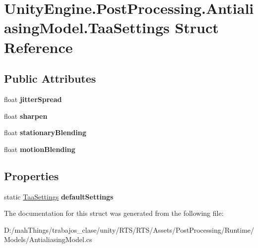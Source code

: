 \hypertarget{struct_unity_engine_1_1_post_processing_1_1_antialiasing_model_1_1_taa_settings}{}\section{Unity\+Engine.\+Post\+Processing.\+Antialiasing\+Model.\+Taa\+Settings Struct Reference}
\label{struct_unity_engine_1_1_post_processing_1_1_antialiasing_model_1_1_taa_settings}
\subsection*{Public Attributes}
\begin{DoxyCompactItemize}
\item 
\mbox{\label{struct_unity_engine_1_1_post_processing_1_1_antialiasing_model_1_1_taa_settings_a1fb4a56a3c4e2de6c9e9ab5b78c82b01}} 
float {\bfseries jitter\+Spread}
\item 
\mbox{\label{struct_unity_engine_1_1_post_processing_1_1_antialiasing_model_1_1_taa_settings_aac78045457513ebdfdf6b97490e6b181}} 
float {\bfseries sharpen}
\item 
\mbox{\label{struct_unity_engine_1_1_post_processing_1_1_antialiasing_model_1_1_taa_settings_a9c7bfc8641dc5b8229cb526b9a1e1aab}} 
float {\bfseries stationary\+Blending}
\item 
\mbox{\label{struct_unity_engine_1_1_post_processing_1_1_antialiasing_model_1_1_taa_settings_af1be8bba7027153437fcab9d9f143cf9}} 
float {\bfseries motion\+Blending}
\end{DoxyCompactItemize}
\subsection*{Properties}
\begin{DoxyCompactItemize}
\item 
\mbox{\label{struct_unity_engine_1_1_post_processing_1_1_antialiasing_model_1_1_taa_settings_a4399b2ac5c558bec9edc9af8d49b8928}} 
static \mbox{\hyperlink{struct_unity_engine_1_1_post_processing_1_1_antialiasing_model_1_1_taa_settings}{Taa\+Settings}} {\bfseries default\+Settings}
\end{DoxyCompactItemize}


The documentation for this struct was generated from the following file\+:\begin{DoxyCompactItemize}
\item 
D\+:/mah\+Things/trabajos\+\_\+clase/unity/\+R\+T\+S/\+R\+T\+S/\+Assets/\+Post\+Processing/\+Runtime/\+Models/Antialiasing\+Model.\+cs\end{DoxyCompactItemize}
